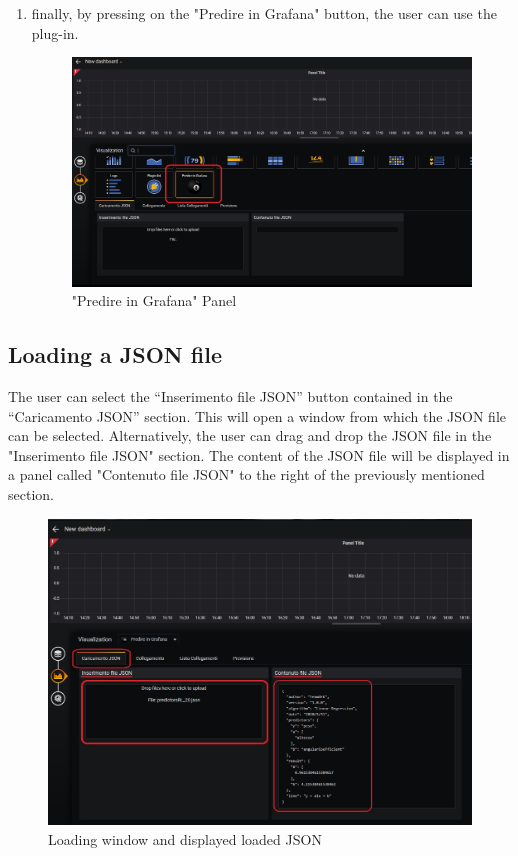 \begin{enumerate}
	\item finally, by pressing on the "Predire in Grafana" button, the user can use the plug-in.
	
\begin{figure}[H]
\centering
\includegraphics[scale=0.55]{img/plug-in/selection_ball.jpg}
\caption{"Predire in Grafana" Panel}
\end{figure}

\end{enumerate}

	
\subsection{Loading a JSON file}
The user can select the “Inserimento file JSON” button contained in the “Caricamento JSON” section.
This will open a window from which the JSON file can be selected.
Alternatively, the user can drag and drop the JSON file in the "Inserimento file JSON" section.
The content of the JSON file will be displayed in a panel called "Contenuto file JSON" to the right of the previously mentioned section.

\begin{figure}[H]
\centering
\includegraphics[scale=0.65]{img/plug-in/loading_js.jpg}
\caption{Loading window and displayed loaded JSON}
\end{figure}


